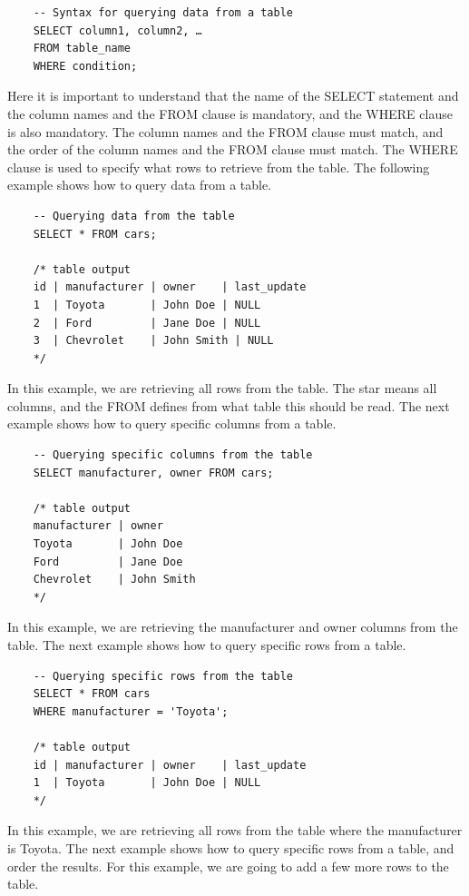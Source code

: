 \begin{verbatim}
    -- Syntax for querying data from a table
    SELECT column1, column2, …
    FROM table_name
    WHERE condition;
\end{verbatim}

Here it is important to understand that the name of the SELECT statement and the column names and the FROM clause is mandatory, and the WHERE clause is also mandatory. The column names and the FROM clause must match, and the order of the column names and the FROM clause must match. The WHERE clause is used to specify what rows to retrieve from the table. The following example shows how to query data from a table.

\begin{verbatim}
    -- Querying data from the table
    SELECT * FROM cars;

    /* table output
    id | manufacturer | owner    | last_update
    1  | Toyota       | John Doe | NULL
    2  | Ford         | Jane Doe | NULL
    3  | Chevrolet    | John Smith | NULL
    */
\end{verbatim}

In this example, we are retrieving all rows from the table. The star means all columns, and the FROM defines from what table this should be read. The next example shows how to query specific columns from a table.

\begin{verbatim}
    -- Querying specific columns from the table
    SELECT manufacturer, owner FROM cars;

    /* table output
    manufacturer | owner
    Toyota       | John Doe
    Ford         | Jane Doe
    Chevrolet    | John Smith
    */
\end{verbatim}

In this example, we are retrieving the manufacturer and owner columns from the table. The next example shows how to query specific rows from a table.

\begin{verbatim}
    -- Querying specific rows from the table
    SELECT * FROM cars
    WHERE manufacturer = 'Toyota';

    /* table output
    id | manufacturer | owner    | last_update
    1  | Toyota       | John Doe | NULL
    */
\end{verbatim}

In this example, we are retrieving all rows from the table where the manufacturer is Toyota. The next example shows how to query specific rows from a table, and order the results. For this example, we are going to add a few more rows to the table.

